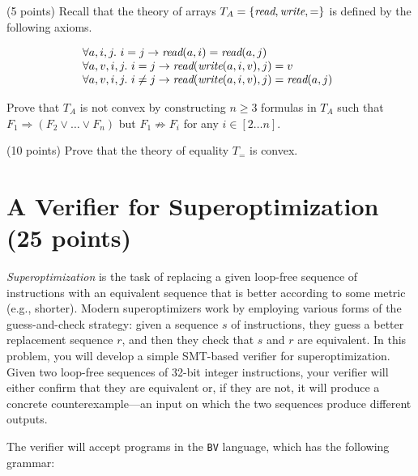 \documentclass{handout}
\begin{document}
\begin{questions}
\begin{enumerate}
\end{enumerate}

\item (5 points) Recall that the theory of arrays $T_A =
\{\emph{read},\emph{write},=\}$ is defined by the following axioms.

\[
\begin{array}{@{}l}
\forall a,i,j. \ i = j \rightarrow \emph{read}(a, i) = \emph{read}(a, j)\\
\forall a,v,i,j. \ i = j \rightarrow \emph{read}(\emph{write}(a, i, v), j) = v\\
\forall a,v,i,j. \ i \neq j \rightarrow \emph{read}(\emph{write}(a, i, v), j) = \emph{read}(a, j)\\
\end{array}
\]

Prove that $T_A$ is not convex by constructing $n\geq 3$ formulas in $T_A$ such
that $F_1 \Rightarrow (F_2 \vee\ldots \vee F_n)$ but $F_1 \not\Rightarrow F_i$
for any $i \in [2\ldots n]$.




\item (10 points) \label{prob:smt:last} Prove that the theory of equality $T_=$
is convex.  





\end{questions}



\section{A Verifier for Superoptimization (25 points)}

\emph{Superoptimization} is the task of replacing a given loop-free sequence of
instructions with an equivalent sequence that is better according to some metric
(e.g., shorter).  Modern superoptimizers work by employing various forms of the
guess-and-check strategy:  given a sequence $s$ of instructions, they guess a
better replacement sequence $r$, and then they check that $s$ and $r$ are
equivalent.  In this problem, you will develop a simple SMT-based verifier for
superoptimization.  Given two loop-free sequences of 32-bit integer
instructions, your verifier will either confirm that they are equivalent or, if
they are not, it will produce a concrete counterexample---an input on which the
two sequences produce different outputs. 

The verifier will accept programs in the \texttt{BV} language, which has the
following grammar:
\end{document}
